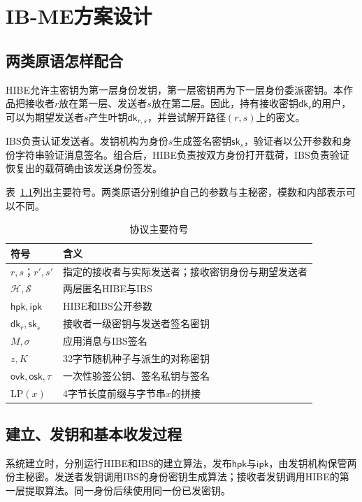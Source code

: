 \chapter{IB-ME方案设计}

\section{两类原语怎样配合}
HIBE允许主密钥为第一层身份发钥，第一层密钥再为下一层身份委派密钥。本作品把接收者$r$放在第一层、发送者$s$放在第二层。因此，持有接收密钥$\mathsf{dk}_r$的用户，可以为期望发送者$s$产生叶钥$\mathsf{dk}_{r,s}$，并尝试解开路径$(r,s)$上的密文。

IBS负责认证发送者。发钥机构为身份$s$生成签名密钥$\mathsf{sk}_s$，验证者以公开参数和身份字符串验证消息签名。组合后，HIBE负责按双方身份打开载荷，IBS负责验证恢复出的载荷确由该发送身份签发。

表~\ref{tab:notations}列出主要符号。两类原语分别维护自己的参数与主秘密，模数和内部表示可以不同。

\begin{table}[H]
\centering\small
\caption{协议主要符号}
\label{tab:notations}
\begin{tabularx}{\textwidth}{@{}p{}X@{}}
\toprule
\rowcolor{black!8} 符号 & 含义 \\
\midrule
$r,s$；$r',s'$ & 指定的接收者与实际发送者；接收密钥身份与期望发送者 \\
$\mathcal H,\mathcal S$ & 两层匿名HIBE与IBS \\
$\mathsf{hpk},\mathsf{ipk}$ & HIBE和IBS公开参数 \\
$\mathsf{dk}_r,\mathsf{sk}_s$ & 接收者一级密钥与发送者签名密钥 \\
$M,\sigma$ & 应用消息与IBS签名 \\
$z,K$ & 32字节随机种子与派生的对称密钥 \\
$\mathsf{ovk},\mathsf{osk},\tau$ & 一次性验签公钥、签名私钥与签名 \\
$\mathrm{LP}(x)$ & 4字节长度前缀与字节串$x$的拼接 \\
\bottomrule
\end{tabularx}
\end{table}

\section{建立、发钥和基本收发过程}
系统建立时，分别运行HIBE和IBS的建立算法，发布$\mathsf{hpk}$与$\mathsf{ipk}$，由发钥机构保管两份主秘密。发送者发钥调用IBS的身份密钥生成算法；接收者发钥调用HIBE的第一层提取算法。同一身份后续使用同一份已发密钥。

